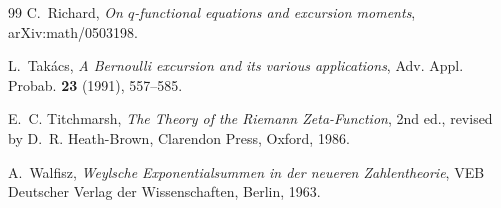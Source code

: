 \documentclass[11pt]{amsart}
\numberwithin{equation}{section}
\theoremstyle{plain}
\theoremstyle{definition}
\theoremstyle{remark}
\begin{document}
\begin{thebibliography}{99}
C.~Richard, \emph{On $q$-functional equations and excursion moments},
arXiv:math/0503198.

L.~Tak\'acs, \emph{A Bernoulli excursion and its various applications},
Adv. Appl. Probab. \textbf{23} (1991), 557--585.

E.~C. Titchmarsh, \emph{The Theory of the Riemann Zeta-Function}, 2nd ed.,
revised by D.~R. Heath-Brown, Clarendon Press, Oxford, 1986.

A.~Walfisz, \emph{Weylsche Exponentialsummen in der neueren Zahlentheorie},
VEB Deutscher Verlag der Wissenschaften, Berlin, 1963.

\end{thebibliography}
\end{document}
